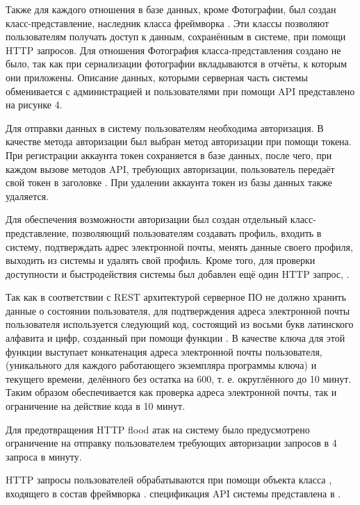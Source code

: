 \tab
Также для каждого отношения в базе данных, кроме Фотографии, был создан класс-представление, наследник класса  фреймворка .
Эти классы позволяют пользователям получать доступ к данным, сохранённым в системе, при помощи HTTP запросов.
Для отношения Фотография класса-представления создано не было, так как при сериализации фотографии вкладываются в отчёты, к которым они приложены.
Описание данных, которыми серверная часть системы обменивается с администрацией и пользователями при помощи API представлено на рисунке 4.
\picturefour

\tab
Для отправки данных в систему пользователям необходима авторизация. В качестве метода авторизации был выбран метод авторизации при помощи токена. При регистрации аккаунта токен сохраняется в базе данных, после чего, при каждом вызове методов API, требующих авторизации, пользователь передаёт свой токен в заголовке . При удалении аккаунта токен из базы данных также удаляется.

\tab
Для обеспечения возможности авторизации был создан отдельный класс-представление, позволяющий пользователям создавать профиль, входить в систему, подтверждать адрес электронной почты, менять данные своего профиля, выходить из системы и удалять свой профиль.
Кроме того, для проверки доступности и быстродействия системы был добавлен ещё один HTTP запрос, .

\tab
Так как в соответствии с REST архитектурой серверное ПО не должно хранить данные о состоянии пользователя, для подтверждения адреса электронной почты пользователя используется следующий код, состоящий из восьми букв латинского алфавита и цифр, созданный при помощи функции .
В качестве ключа для этой функции выступает конкатенация адреса электронной почты пользователя,  (уникального для каждого работающего экземпляра программы ключа) и  текущего времени, делённого без остатка на 600, т. е. округлённого до 10 минут.
Таким образом обеспечивается как проверка адреса электронной почты, так и ограничение на действие кода в 10 минут.

\tab
Для предотвращения HTTP flood атак на систему было предусмотрено ограничение на отправку пользователем требующих авторизации запросов в 4 запроса в минуту.

\tab
HTTP запросы пользователей обрабатываются при помощи объекта класса , входящего в состав фреймворка .  спецификация API системы представлена в .

